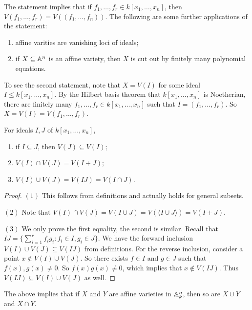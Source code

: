 \begin{remark}
  The statement implies that if
  $f_1, \dots, f_r \in k[x_1, \dots, x_n]$,
  then $V(f_1, \dots, f_r) = V((f_1, \dots, f_n))$.
  The following are some further
  applications of the statement:
  \begin{enumerate}
    \item affine varities are vanishing
      loci of ideals;
    \item if $X \subseteq \mathbb{A}^n$ is an
      affine variety, then $X$ is cut out
      by finitely many polynomial
      equations.
  \end{enumerate}
  To see the second statement, note that
  $X = V(I)$ for some ideal $I \le k[x_1, \dots, x_n]$.
  By the Hilbert basis theorem that
  $k[x_1, \dots, x_n]$ is Noetherian,
  there are finitely many
  $f_1, \dots, f_r \in k[x_1, \dots, x_n]$
  such that $I = (f_1, \dots, f_r)$.
  So $X = V(I) = V(f_1, \dots, f_r)$.
\end{remark}

\begin{prop}
  For ideals $I, J$ of $k[x_1, \dots, x_n]$,
  \begin{enumerate}
    \item if $I \subseteq J$, then
      $V(J) \subseteq V(I)$;
    \item $V(I) \cap V(J) = V(I + J)$;
    \item $V(I) \cup V(J) = V(IJ) = V(I \cap J)$.
  \end{enumerate}
\end{prop}

\begin{proof}
  $(1)$ This follows from definitions
  and actually holds for general subsets.

  $(2)$ Note that
  $V(I) \cap V(J) = V(I \cup J) = V(\langle I \cup J \rangle) = V(I + J)$.

  $(3)$
  We only prove the first equality, the
  second is similar.
  Recall that $IJ = \big\{{\sum_{i = 1}^r f_i g_i : f_i \in I, g_i \in J}\big\}$.
  We have the forward inclusion
  $V(I) \cup V(J) \subseteq V(IJ)$ from
  definitions. For the reverse inclusion,
  consider a point $x \notin V(I) \cup V(J)$.
  So there exists $f \in I$ and
  $g \in J$ such that $f(x), g(x) \ne 0$.
  So $f(x)g(x) \ne 0$, which implies
  that $x \notin V(IJ)$. Thus
  $V(IJ) \subseteq V(I) \cup V(J)$ as well.
\end{proof}

\begin{remark}
  The above implies that if $X$ and $Y$
  are affine varieties in $\mathbb{A}^n_k$,
  then so are $X \cup Y$ and $X \cap Y$.
\end{remark}

